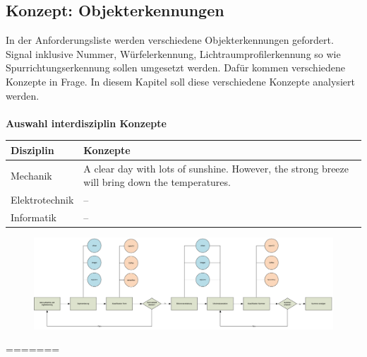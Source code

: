 \documentclass[../../main.tex]{subfiles}
\begin{document}
    \subsection{Konzept: Objekterkennungen}
    In der Anforderungsliste werden verschiedene Objekterkennungen gefordert. Signal inklusive Nummer,
    Würfelerkennung, Lichtraumprofilerkennung so wie Spurrichtungserkennung sollen umgesetzt werden. Dafür 
    kommen verschiedene Konzepte in Frage. In diesem Kapitel soll diese verschiedene Konzepte analysiert 
    werden.\\
    \\

    \textbf{Auswahl interdisziplin Konzepte}\\

    

    \begin{flushleft}
        \begin{tabular}{ | l | p{11cm} |}
        \hline
        \textbf{Disziplin} & \textbf{Konzepte} \\ \hline
        Mechanik & A clear day with lots of sunshine. However, the strong breeze will bring down the
        temperatures. \\ \hline
        Elektrotechnik & -- \\ \hline
        Informatik & -- \\ \hline
        \end{tabular}
    \end{flushleft}


    
    \vspace{2cm}
    \begin{figure}[H] %
        \centering
        \includegraphics[width=1\textwidth]{Ablauf_vision.PNG}
    \end{figure}


=======
    \graphicspath{{images/Objekterkennung/}{../../images/Objekterkennung/}}
\end{document}
